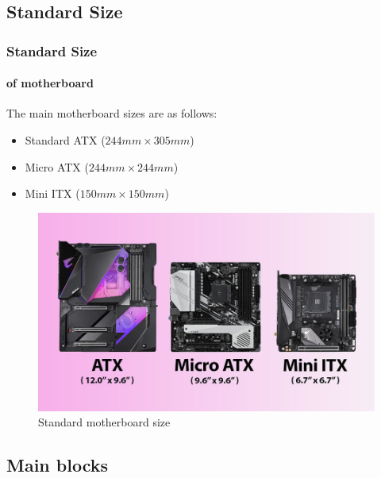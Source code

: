 \documentclass[
	12pt, %
]{beamer}
\begin{document}
\subsection{Standard Size}

\begin{frame}
	\frametitle{Standard Size}
	\framesubtitle{of motherboard} %
	
	The main motherboard sizes are as follows:
	\begin{itemize}
		\item Standard ATX ($244mm \times 305mm$)
		\item Micro ATX ($244mm \times 244mm$)
		\item Mini ITX ($150mm \times 150mm$)
	\end{itemize}
	
	\bigskip %
	
	\begin{figure}
		\centering
		\includegraphics[width=0.5\linewidth]{Images/img1.jpg}
		\caption{Standard motherboard size}
		\label{motherboard size}
	\end{figure}
\end{frame}


\subsection{Main blocks}
\end{document}
